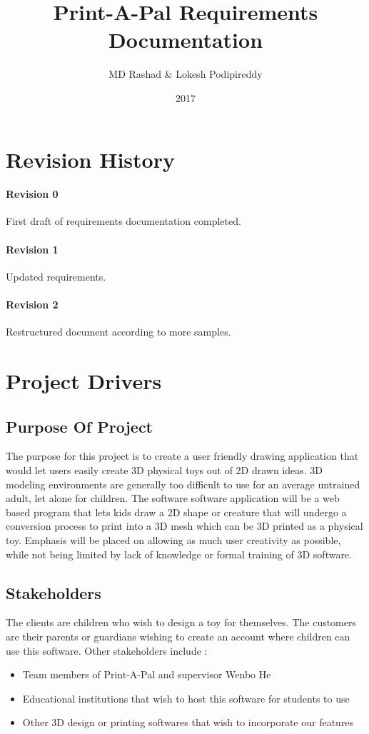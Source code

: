 \documentclass{report}
\title{Print-A-Pal \linebreak Requirements Documentation}
\author{MD Rashad \& Lokesh Podipireddy}
\date{2017}
\begin{document}
\maketitle

\tableofcontents


\chapter{Revision History}
\subsubsection{Revision 0}
First draft of requirements documentation completed.
\subsubsection{Revision 1} Updated requirements.
\subsubsection{Revision 2} Restructured document according to more samples.

\chapter{Project Drivers}
\section{Purpose Of Project}
The purpose for this project is to create a user friendly drawing application that would let users easily create 3D physical toys out of 2D drawn ideas.  3D modeling environments are generally too difficult to use for an average untrained adult, let alone for children.  The software software application will be a web based program that lets kids draw a 2D shape or creature that will undergo a conversion process to print into a 3D mesh which can be 3D printed as a physical toy.  Emphasis will be placed on allowing as much user creativity as possible, while not being limited by lack of knowledge or formal training of 3D software.
 
\section{Stakeholders}
The clients are children who wish to design a toy for themselves.  The customers are their parents or guardians wishing to create an account where children can use this software.  Other stakeholders include :
\begin{itemize}
\item Team members of Print-A-Pal and supervisor Wenbo He
\item Educational institutions that wish to host this software for students to use
\item Other 3D design or printing softwares that wish to incorporate our features
\end{itemize}
\end{document}

